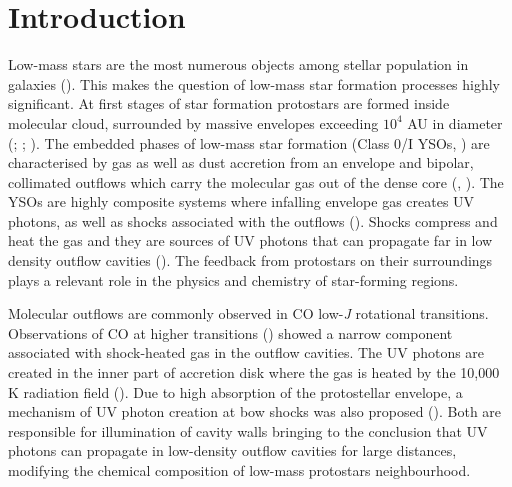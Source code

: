 \documentclass{aa}
\begin{document}
\section{Introduction}
Low-mass stars are the most numerous objects among stellar population in galaxies (\citealt{Kro02}). This makes the question of low-mass star formation processes highly significant. At first stages of star formation protostars are formed inside molecular cloud, surrounded by massive envelopes exceeding $10^4$ AU in diameter (\citealt{Lad87}; \citealt{Lar03}; \citealt{Ber07}). The embedded phases of low-mass star formation (Class 0/I YSOs, \citealt{And93}) are characterised by gas as well as dust accretion from an envelope and bipolar, collimated outflows which carry the molecular gas out of the dense core (\citealt{Zuc76}, \citealt{Arc06}). The YSOs are highly composite systems where infalling envelope gas creates UV photons, as well as shocks associated with the outflows (\citealt{Spa95}). Shocks compress and heat the gas and they are sources of UV photons that can propagate far in low density outflow cavities (\citealt{vKe09}). The feedback from protostars on their surroundings plays a relevant role in the physics and chemistry of star-forming regions. 
 
Molecular outflows are commonly observed in CO low-\textit{J} rotational transitions. Observations of CO at higher transitions (\citealt{Hog99}) showed a narrow component associated with shock-heated gas in the outflow cavities. The UV photons are created in the inner part of accretion disk where the gas is heated by the 10,000 K radiation field (\citealt{Spa95}). Due to high absorption of the protostellar envelope, a mechanism of UV photon creation at bow shocks was also proposed (\citealt{vKe09}). Both are responsible for illumination of cavity walls bringing to the conclusion that UV photons can propagate in low-density outflow cavities for large distances, modifying the chemical composition of low-mass protostars neighbourhood. 
\end{document}
